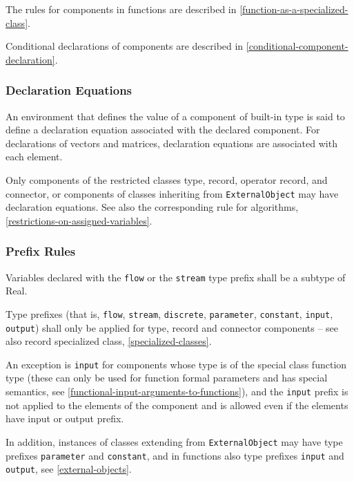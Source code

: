 The rules for components in functions are described in \cref{function-as-a-specialized-class}.

Conditional declarations of components are described in \cref{conditional-component-declaration}.

\subsubsection{Declaration Equations}\label{declaration-equations}

An environment that defines the value of a component of built-in type is
said to define a declaration equation associated with the declared
component. For declarations of vectors and matrices, declaration
equations are associated with each element.

Only components of the restricted classes type, record, operator record, and connector, or components of classes inheriting from \lstinline!ExternalObject!
may have declaration equations. See also the corresponding rule for algorithms, \cref{restrictions-on-assigned-variables}.

\subsubsection{Prefix Rules}\label{prefix-rules}

Variables declared with the \lstinline!flow! or the \lstinline!stream! type prefix shall be a
subtype of Real.

Type prefixes (that is, \lstinline!flow!, \lstinline!stream!, \lstinline!discrete!, \lstinline!parameter!, \lstinline!constant!, \lstinline!input!, \lstinline!output!) shall only be applied for type,
record and connector components -- see also record specialized class, \cref{specialized-classes}.

An exception is \lstinline!input! for components whose type is of the special class
function type (these can only be used for function formal parameters and
has special semantics, see \cref{functional-input-arguments-to-functions}), and the \lstinline!input! prefix is not
applied to the elements of the component and is allowed even if the
elements have input or output prefix.

In addition, instances of classes extending from \lstinline!ExternalObject! may have type prefixes \lstinline!parameter! and \lstinline!constant!, and in functions also type prefixes
\lstinline!input! and \lstinline!output!, see \cref{external-objects}.

